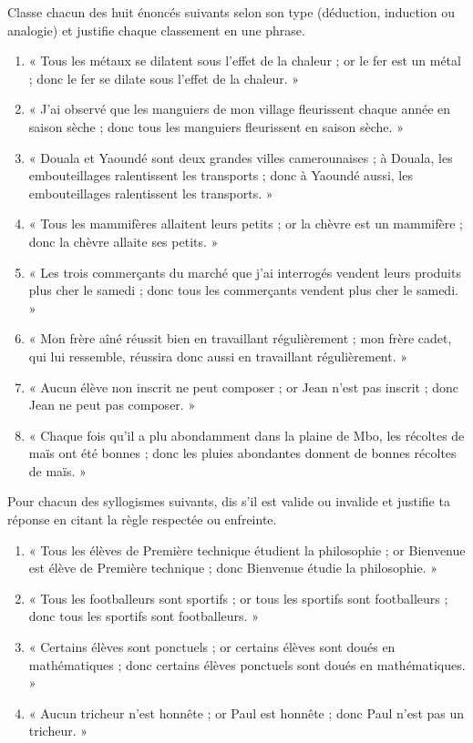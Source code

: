 \documentclass[11pt]{article}
\begin{document}
\begin{exercice}
Classe chacun des huit énoncés suivants selon son type (déduction, induction ou analogie) et justifie chaque classement en une phrase.
\begin{enumerate}
\item « Tous les métaux se dilatent sous l'effet de la chaleur ; or le fer est un métal ; donc le fer se dilate sous l'effet de la chaleur. »
\item « J'ai observé que les manguiers de mon village fleurissent chaque année en saison sèche ; donc tous les manguiers fleurissent en saison sèche. »
\item « Douala et Yaoundé sont deux grandes villes camerounaises ; à Douala, les embouteillages ralentissent les transports ; donc à Yaoundé aussi, les embouteillages ralentissent les transports. »
\item « Tous les mammifères allaitent leurs petits ; or la chèvre est un mammifère ; donc la chèvre allaite ses petits. »
\item « Les trois commerçants du marché que j'ai interrogés vendent leurs produits plus cher le samedi ; donc tous les commerçants vendent plus cher le samedi. »
\item « Mon frère aîné réussit bien en travaillant régulièrement ; mon frère cadet, qui lui ressemble, réussira donc aussi en travaillant régulièrement. »
\item « Aucun élève non inscrit ne peut composer ; or Jean n'est pas inscrit ; donc Jean ne peut pas composer. »
\item « Chaque fois qu'il a plu abondamment dans la plaine de Mbo, les récoltes de maïs ont été bonnes ; donc les pluies abondantes donnent de bonnes récoltes de maïs. »
\end{enumerate}
\end{exercice}

\begin{exercice}
Pour chacun des syllogismes suivants, dis s'il est valide ou invalide et justifie ta réponse en citant la règle respectée ou enfreinte.
\begin{enumerate}
\item « Tous les élèves de Première technique étudient la philosophie ; or Bienvenue est élève de Première technique ; donc Bienvenue étudie la philosophie. »
\item « Tous les footballeurs sont sportifs ; or tous les sportifs sont footballeurs ; donc tous les sportifs sont footballeurs. »
\item « Certains élèves sont ponctuels ; or certains élèves sont doués en mathématiques ; donc certains élèves ponctuels sont doués en mathématiques. »
\item « Aucun tricheur n'est honnête ; or Paul est honnête ; donc Paul n'est pas un tricheur. »
\end{enumerate}
\end{exercice}
\end{document}
